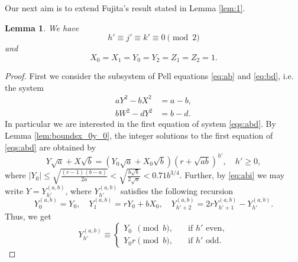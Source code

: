 \documentclass{amsart}
\newtheorem{lemma}{Lemma}
\theoremstyle{definition}
\begin{document}
Our next aim is to extend Fujita's result stated in Lemma \ref{lem:1}.

\begin{lemma}\label{lem:2}
We have $$h'\equiv j'\equiv k' \equiv 0 \pmod{2}$$and $$X_0=X_1=Y_0=Y_2=Z_1=Z_2=1.$$ 
\end{lemma}

\begin{proof}
First we consider the subsystem of Pell equations \eqref{eq:ab} and \eqref{eq:bd}, i.e. the system
\begin{equation}\label{eqs:abd}
\begin{split}
aY^2 - bX^2 &= a - b, \\
bW^2 - dY^2 &= b - d.
\end{split}
\end{equation}
In particular we are interested in the first equation of system \eqref{eqs:abd}.
By Lemma \ref{lem:boundsx_0y_0}, the integer solutions to the first equation of \eqref{eqs:abd} are obtained by   
$$
Y \sqrt{a} + X \sqrt{b} = (Y_0 \sqrt{a}+ X_0 \sqrt{b})(r+\sqrt{ab})^{h'},\quad h'\ge 0,
$$
where  $|Y_0| \le \sqrt{\frac{(r-1)(b-a)}{2a}}<\sqrt{\frac{b\sqrt{b}}{2\sqrt{a}}}<0.71b^{3/4}$. 
Further, by \eqref{eq:abi} we may write $Y = Y^{(a,b)}_{h'}$, where $Y^{(a,b)}_{h'}$ satisfies the following recursion
$$
Y^{(a,b)}_{0} = Y_0, \quad Y^{(a,b)}_{1} = r Y_0  + b X_0, \quad Y^{(a,b)}_{h'+2} = 2r  Y^{(a,b)}_{h'+1} -  Y^{(a,b)}_{h'}. 
$$
Thus, we get 
\begin{equation}\label{eq:betaab}
 Y^{(a,b)}_{h'}\equiv  \begin{cases}
Y_0\phantom{r}\pmod{b},& \quad \mbox{if}\,\, h'\,\, \mbox{even}, \\
Y_0r\pmod{b},& \quad \mbox{if}\,\, h'\,\, \mbox{odd}.
                                      \end{cases}
\end{equation}


\end{proof}
\end{document}

